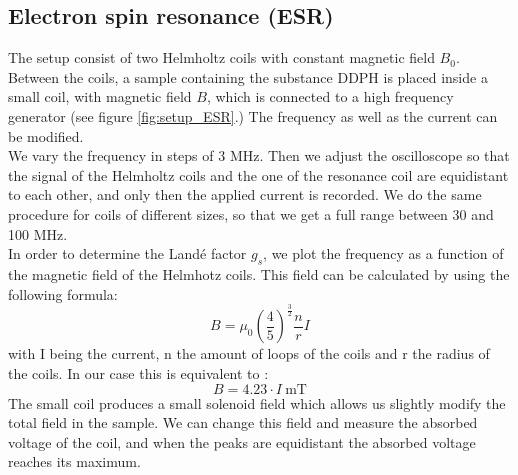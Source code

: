 \documentclass{scrartcl}
\begin{document}
\subsection{Electron spin resonance (ESR)}
The setup consist of two Helmholtz coils with constant magnetic field $B_0$. Between the coils, a sample containing the substance DDPH is placed inside a small coil, with magnetic field $B$, which is connected to a high frequency generator (see figure \ref{fig:setup_ESR}.) The frequency as well as the current can be modified.\\
We vary the frequency in steps of 3 MHz. Then we adjust the oscilloscope so that the signal of the Helmholtz coils and the one of the resonance coil are equidistant to each other, and only then the applied current is recorded. We do the same procedure for coils of different sizes, so that we get a full range between 30 and 100 MHz.\\
In order to determine the Landé factor $g_s$, we plot the frequency as a function of the magnetic field of the Helmhotz coils. This field can be calculated by using the following formula:
\begin{equation}
    B = \mu_0 \left( \frac{4}{5} \right)^\frac{3}{2}\frac{n}{r}I
    \label{equation_B}
\end{equation}
with I being the current, n the amount of loops of the coils and r the radius of the coils. In our case this is equivalent to :
\begin{equation}
    B = 4.23 \cdot I \ \text{mT}
\end{equation}
The small coil produces a small solenoid field which allows us slightly modify the total field in the sample. We can change this field and measure the absorbed voltage of the coil, and when the peaks are equidistant the absorbed voltage reaches its maximum.
\end{document}
